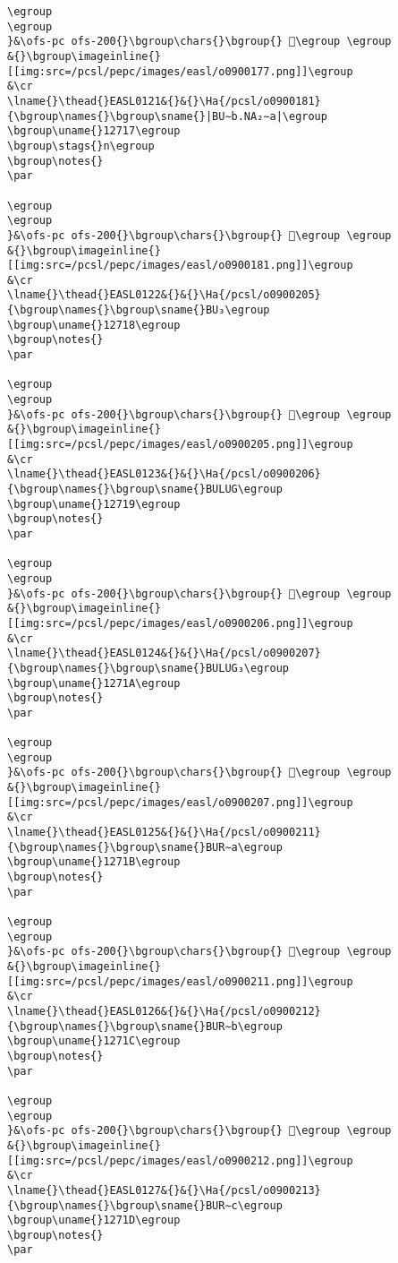 \begin{verbatim}
\egroup
\egroup
}&\ofs-pc ofs-200{}\bgroup\chars{}\bgroup{} 𒜖\egroup \egroup
&{}\bgroup\imageinline{}[[img:src=/pcsl/pepc/images/easl/o0900177.png]]\egroup
&\cr
\lname{}\thead{}EASL0121&{}&{}\Ha{/pcsl/o0900181}{\bgroup\names{}\bgroup\sname{}|BU∼b.NA₂∼a|\egroup
\bgroup\uname{}12717\egroup
\bgroup\stags{}n\egroup
\bgroup\notes{}
\par 

\egroup
\egroup
}&\ofs-pc ofs-200{}\bgroup\chars{}\bgroup{} 𒜗\egroup \egroup
&{}\bgroup\imageinline{}[[img:src=/pcsl/pepc/images/easl/o0900181.png]]\egroup
&\cr
\lname{}\thead{}EASL0122&{}&{}\Ha{/pcsl/o0900205}{\bgroup\names{}\bgroup\sname{}BU₃\egroup
\bgroup\uname{}12718\egroup
\bgroup\notes{}
\par 

\egroup
\egroup
}&\ofs-pc ofs-200{}\bgroup\chars{}\bgroup{} 𒜘\egroup \egroup
&{}\bgroup\imageinline{}[[img:src=/pcsl/pepc/images/easl/o0900205.png]]\egroup
&\cr
\lname{}\thead{}EASL0123&{}&{}\Ha{/pcsl/o0900206}{\bgroup\names{}\bgroup\sname{}BULUG\egroup
\bgroup\uname{}12719\egroup
\bgroup\notes{}
\par 

\egroup
\egroup
}&\ofs-pc ofs-200{}\bgroup\chars{}\bgroup{} 𒜙\egroup \egroup
&{}\bgroup\imageinline{}[[img:src=/pcsl/pepc/images/easl/o0900206.png]]\egroup
&\cr
\lname{}\thead{}EASL0124&{}&{}\Ha{/pcsl/o0900207}{\bgroup\names{}\bgroup\sname{}BULUG₃\egroup
\bgroup\uname{}1271A\egroup
\bgroup\notes{}
\par 

\egroup
\egroup
}&\ofs-pc ofs-200{}\bgroup\chars{}\bgroup{} 𒜚\egroup \egroup
&{}\bgroup\imageinline{}[[img:src=/pcsl/pepc/images/easl/o0900207.png]]\egroup
&\cr
\lname{}\thead{}EASL0125&{}&{}\Ha{/pcsl/o0900211}{\bgroup\names{}\bgroup\sname{}BUR∼a\egroup
\bgroup\uname{}1271B\egroup
\bgroup\notes{}
\par 

\egroup
\egroup
}&\ofs-pc ofs-200{}\bgroup\chars{}\bgroup{} 𒜛\egroup \egroup
&{}\bgroup\imageinline{}[[img:src=/pcsl/pepc/images/easl/o0900211.png]]\egroup
&\cr
\lname{}\thead{}EASL0126&{}&{}\Ha{/pcsl/o0900212}{\bgroup\names{}\bgroup\sname{}BUR∼b\egroup
\bgroup\uname{}1271C\egroup
\bgroup\notes{}
\par 

\egroup
\egroup
}&\ofs-pc ofs-200{}\bgroup\chars{}\bgroup{} 𒜜\egroup \egroup
&{}\bgroup\imageinline{}[[img:src=/pcsl/pepc/images/easl/o0900212.png]]\egroup
&\cr
\lname{}\thead{}EASL0127&{}&{}\Ha{/pcsl/o0900213}{\bgroup\names{}\bgroup\sname{}BUR∼c\egroup
\bgroup\uname{}1271D\egroup
\bgroup\notes{}
\par 


\end{verbatim}

